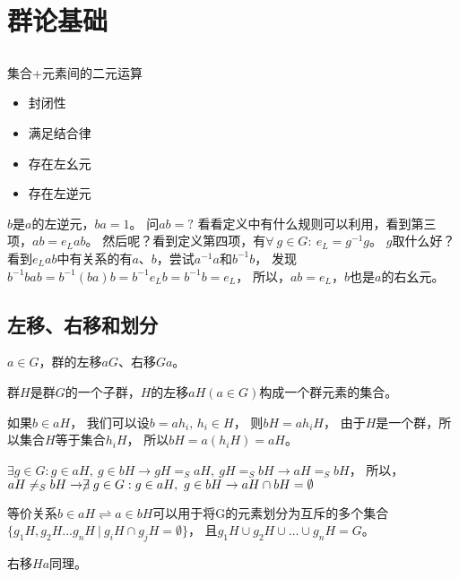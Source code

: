 \section{群论基础}

\subsection{}

\noindent 集合+元素间的二元运算
\begin{itemize}
    \item 封闭性
    \item 满足结合律
    \item 存在左幺元
    \item 存在左逆元
\end{itemize}

$b$是$a$的左逆元，$ba=1$。
问$ab=?$
看看定义中有什么规则可以利用，看到第三项，$ab=e_{L}ab$。
然后呢？看到定义第四项，有$\forall\ g\in G:\ e_{L}=g^{-1}g$。
$g$取什么好？看到$e_{L}ab$中有关系的有$a$、$b$，尝试$a^{-1}a$和$b^{-1}b$，
发现$b^{-1}bab=b^{-1}(ba)b=b^{-1}e_{L}b=b^{-1}b=e_{L}$，
所以，$ab=e_{L}$，$b$也是$a$的右幺元。

\subsection{左移、右移和划分}

$a\in G$，群的左移$aG$、右移$Ga$。

群$H$是群$G$的一个子群，$H$的左移$aH(a\in G)$构成一个群元素的集合。

如果$b\in aH$，
我们可以设$b= ah_{i},\,h_{i}\in H$，
则$bH=ah_{i}H$，
由于$H$是一个群，所以集合$H$等于集合$h_{i}H$，
所以$bH=a(h_{i}H)=aH$。

$\exists g\in G:g\in aH,\ g\in bH\rightarrow gH=_{S}aH,\ gH=_{S}bH\rightarrow aH=_{S}bH$，
所以，$aH\neq_{S} bH\rightarrow \centernot\exists g\in G:g\in aH,\ g\in bH\rightarrow aH\cap bH=\emptyset$

等价关系$b\in aH\rightleftharpoons a\in bH$可以用于将G的元素划分为互斥的多个集合
$\{g_{1}H,g_{2}H...g_{n}H\ |\ g_{i}H\cap g_{j}H=\emptyset\}$，
且$g_{1}H\cup g_{2}H\cup ...\cup g_{n}H=G$。

右移$Ha$同理。


